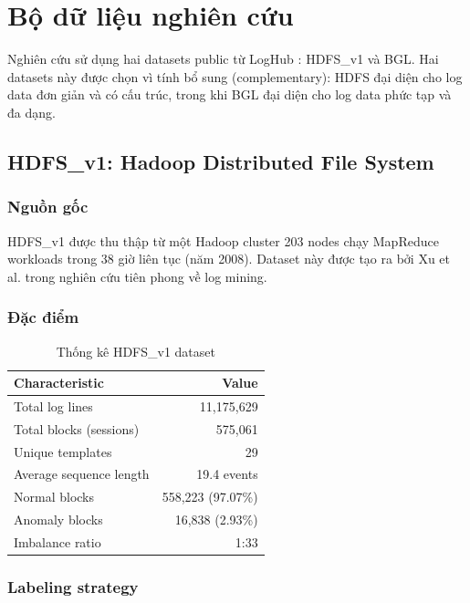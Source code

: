 \section{Bộ dữ liệu nghiên cứu}
\label{sec:datasets}

Nghiên cứu sử dụng hai datasets public từ LogHub \cite{zhu2023loghub}: HDFS\_v1 và BGL. Hai datasets này được chọn vì tính bổ sung (complementary): HDFS đại diện cho log data đơn giản và có cấu trúc, trong khi BGL đại diện cho log data phức tạp và đa dạng.

\subsection{HDFS\_v1: Hadoop Distributed File System}

\subsubsection{Nguồn gốc}

HDFS\_v1 được thu thập từ một Hadoop cluster 203 nodes chạy MapReduce workloads trong 38 giờ liên tục (năm 2008). Dataset này được tạo ra bởi Xu et al. \cite{xu2009detecting} trong nghiên cứu tiên phong về log mining.

\subsubsection{Đặc điểm}

\begin{table}[h]
\centering
\caption{Thống kê HDFS\_v1 dataset}
\label{tab:hdfs-stats}
\begin{tabular}{lr}
\toprule
\textbf{Characteristic} & \textbf{Value} \\
\midrule
Total log lines & 11,175,629 \\
Total blocks (sessions) & 575,061 \\
Unique templates & 29 \\
Average sequence length & 19.4 events \\
Normal blocks & 558,223 (97.07\%) \\
Anomaly blocks & 16,838 (2.93\%) \\
Imbalance ratio & 1:33 \\
\bottomrule
\end{tabular}
\end{table}

\subsubsection{Labeling strategy}

